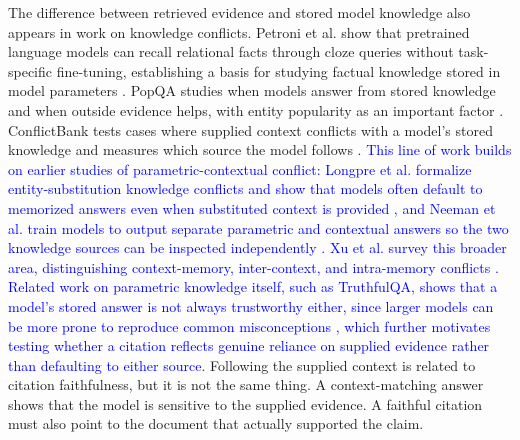 \documentclass[a4paper,fleqn]{cas-sc}
\begin{document}
The difference between retrieved evidence and stored model knowledge also appears in work on knowledge conflicts. Petroni et al. show that pretrained language models can recall relational facts through cloze queries without task-specific fine-tuning, establishing a basis for studying factual knowledge stored in model parameters \cite{petroni2019knowledge}. PopQA studies when models answer from stored knowledge and when outside evidence helps, with entity popularity as an important factor \cite{mallen2023popqa}. ConflictBank tests cases where supplied context conflicts with a model's stored knowledge and measures which source the model follows \cite{su2024conflictbank}. \textcolor{blue}{This line of work builds on earlier studies of parametric-contextual conflict: Longpre et al. formalize entity-substitution knowledge conflicts and show that models often default to memorized answers even when substituted context is provided \cite{longpre2021entity}, and Neeman et al. train models to output separate parametric and contextual answers so the two knowledge sources can be inspected independently \cite{neeman2023disentqa}. Xu et al. survey this broader area, distinguishing context-memory, inter-context, and intra-memory conflicts \cite{xu2024knowledgeconflicts}. Related work on parametric knowledge itself, such as TruthfulQA, shows that a model's stored answer is not always trustworthy either, since larger models can be more prone to reproduce common misconceptions \cite{lin2022truthfulqa}, which further motivates testing whether a citation reflects genuine reliance on supplied evidence rather than defaulting to either source.} Following the supplied context is related to citation faithfulness, but it is not the same thing. A context-matching answer shows that the model is sensitive to the supplied evidence. A faithful citation must also point to the document that actually supported the claim.
\end{document}
